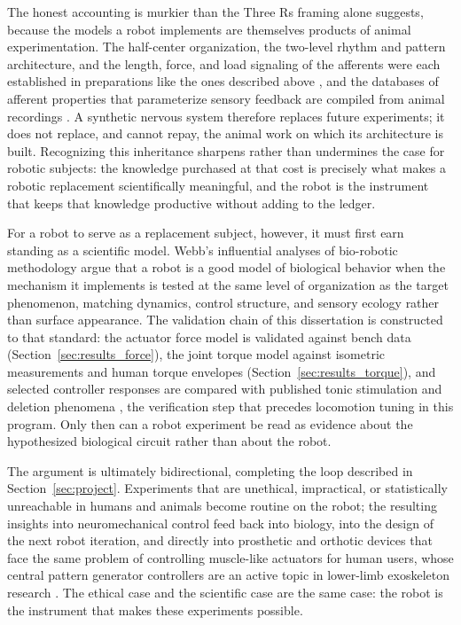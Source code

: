 The honest accounting is murkier than the Three Rs framing alone suggests, because the models a robot implements are themselves products of animal experimentation. The half-center organization, the two-level rhythm and pattern architecture, and the length, force, and load signaling of the afferents were each established in preparations like the ones described above \citep{brown_intrinsic_1911, severin_1967, rybak_modelling_2006}, and the databases of afferent properties that parameterize sensory feedback are compiled from animal recordings \citep{bolen_sensory_2023}. A synthetic nervous system therefore replaces future experiments; it does not replace, and cannot repay, the animal work on which its architecture is built. Recognizing this inheritance sharpens rather than undermines the case for robotic subjects: the knowledge purchased at that cost is precisely what makes a robotic replacement scientifically meaningful, and the robot is the instrument that keeps that knowledge productive without adding to the ledger.

For a robot to serve as a replacement subject, however, it must first earn standing as a scientific model. Webb's influential analyses of bio-robotic methodology \citep{webb_robots_2001, webb_robots_2002} argue that a robot is a good model of biological behavior when the mechanism it implements is tested at the same level of organization as the target phenomenon, matching dynamics, control structure, and sensory ecology rather than surface appearance. The validation chain of this dissertation is constructed to that standard: the actuator force model is validated against bench data (Section~\ref{sec:results_force}), the joint torque model against isometric measurements and human torque envelopes (Section~\ref{sec:results_torque}), and selected controller responses are compared with published tonic stimulation and deletion phenomena \citep{selionov_tonic_2009, rybak_modelling_2006}, the verification step that precedes locomotion tuning in this program. Only then can a robot experiment be read as evidence about the hypothesized biological circuit rather than about the robot.

The argument is ultimately bidirectional, completing the loop described in Section~\ref{sec:project}. Experiments that are unethical, impractical, or statistically unreachable in humans and animals become routine on the robot; the resulting insights into neuromechanical control feed back into biology, into the design of the next robot iteration, and directly into prosthetic and orthotic devices that face the same problem of controlling muscle-like actuators for human users, whose central pattern generator controllers are an active topic in lower-limb exoskeleton research \citep{duan_gait_2024, pery_benchmarking_2026}. The ethical case and the scientific case are the same case: the robot is the instrument that makes these experiments possible.

